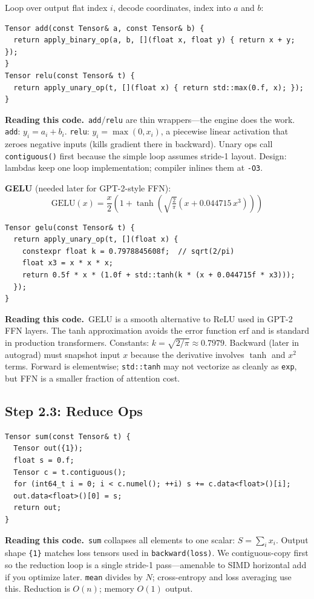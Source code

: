 \documentclass[11pt,a4paper]{article}
\newcommand{\explain}{\par\smallskip\noindent}
\newcommand{\exhead}{\textbf{Reading this code.}\ }
\begin{document}
Loop over output flat index $i$, decode coordinates, index into $a$ and $b$:
\begin{lstlisting}[style=cpp]
Tensor add(const Tensor& a, const Tensor& b) {
  return apply_binary_op(a, b, [](float x, float y) { return x + y; });
}
Tensor relu(const Tensor& t) {
  return apply_unary_op(t, [](float x) { return std::max(0.f, x); });
}
\end{lstlisting}
\explain\exhead \texttt{add}/\texttt{relu} are thin wrappers---the engine does the work.
\texttt{add}: $y_i = a_i + b_i$. \texttt{relu}: $y_i = \max(0, x_i)$, a piecewise linear
activation that zeroes negative inputs (kills gradient there in backward). Unary ops call
\texttt{contiguous()} first because the simple loop assumes stride-1 layout. Design: lambdas
keep one loop implementation; compiler inlines them at \texttt{-O3}.

\textbf{GELU} (needed later for GPT-2-style FFN):
\begin{equation}
  \mathrm{GELU}(x) = \frac{x}{2}\left(1 + \tanh\left(\sqrt{\tfrac{2}{\pi}}(x + 0.044715\,x^3)\right)\right)
\end{equation}
\begin{lstlisting}[style=cpp]
Tensor gelu(const Tensor& t) {
  return apply_unary_op(t, [](float x) {
    constexpr float k = 0.7978845608f;  // sqrt(2/pi)
    float x3 = x * x * x;
    return 0.5f * x * (1.0f + std::tanh(k * (x + 0.044715f * x3)));
  });
}
\end{lstlisting}
\explain\exhead GELU is a smooth alternative to ReLU used in GPT-2 FFN layers. The tanh
approximation avoids the error function $\mathrm{erf}$ and is standard in production transformers.
Constants: $k = \sqrt{2/\pi} \approx 0.7979$. Backward (later in autograd) must snapshot
input $x$ because the derivative involves $\tanh$ and $x^2$ terms. Forward is elementwise;
\texttt{std::tanh} may not vectorize as cleanly as \texttt{exp}, but FFN is a smaller fraction
of attention cost.

\subsection{Step 2.3: Reduce Ops}

\begin{lstlisting}[style=cpp]
Tensor sum(const Tensor& t) {
  Tensor out({1});
  float s = 0.f;
  Tensor c = t.contiguous();
  for (int64_t i = 0; i < c.numel(); ++i) s += c.data<float>()[i];
  out.data<float>()[0] = s;
  return out;
}
\end{lstlisting}
\explain\exhead \texttt{sum} collapses all elements to one scalar: $S = \sum_i x_i$. Output shape
\texttt{\{1\}} matches loss tensors used in \texttt{backward(loss)}. We contiguous-copy first so
the reduction loop is a single stride-1 pass---amenable to SIMD horizontal add if you optimize
later. \texttt{mean} divides by $N$; cross-entropy and loss averaging use this. Reduction is
$O(n)$; memory $O(1)$ output.
\end{document}
